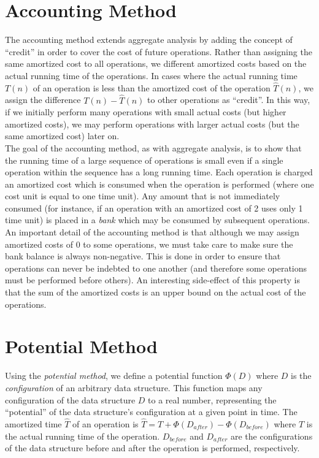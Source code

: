 \documentclass[12pt]{article}
\begin{document}
\section{Accounting Method}
The accounting method extends aggregate analysis by adding the concept of ``credit'' in order to cover the cost of future operations. Rather than assigning the same amortized cost to all operations, we different amortized costs based on the actual running time of the operations. In cases where the actual running time $T(n)$ of an operation is less than the amortized cost of the operation $\hat{T}(n)$, we assign the difference $T(n)-\hat{T}(n)$ to other operations as ``credit''. In this way, if we initially perform many operations with small actual costs (but higher amortized costs), we may perform operations with larger actual costs (but the same amortized cost) later on. \\

The goal of the accounting method, as with aggregate analysis, is to show that the running time of a large sequence of operations is small even if a single operation within the sequence has a long running time. Each operation is charged an amortized cost which is consumed when the operation is performed (where one cost unit is equal to one time unit). Any amount that is not immediately consumed (for instance, if an operation with an amortized cost of 2 uses only 1 time unit) is placed in a \emph{bank} which may be consumed by subsequent operations. \\

An important detail of the accounting method is that although we may assign amortized costs of 0 to some operations, we must take care to make sure the bank balance is always non-negative. This is done in order to ensure that operations can never be indebted to one another (and therefore some operations must be performed before others). An interesting side-effect of this property is that the sum of the amortized costs is an upper bound on the actual cost of the operations.

\section{Potential Method}
Using the \emph{potential method}, we define a potential function $\Phi(D)$ where $D$ is the \emph{configuration} of an arbitrary data structure. This function maps any configuration of the data structure $D$ to a real number, representing the ``potential'' of the data structure's configuration at a given point in time. The amortized time $\hat{T}$ of an operation is $\hat{T} = T+\Phi(D_{after})-\Phi(D_{before})$ where $T$ is the actual running time of the operation. $D_{before}$ and $D_{after}$ are the configurations of the data structure before and after the operation is performed, respectively. \\
\end{document}
